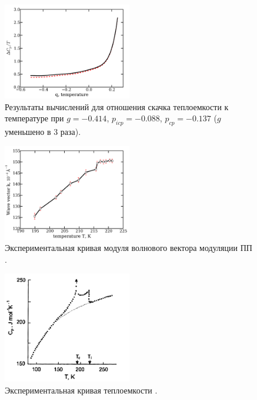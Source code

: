 \begin{figure}\label{fig:g_3-cpt}
\includegraphics[width = 0.5\textwidth]{figs/g_3-cpt.pdf}
\caption{Результаты вычислений для отношения скачка теплоемкости к температуре при $g= -0.414$, $p_{icp}= -0.088$, $p_{cp}=-0.137$ ($g$ уменьшено в 3 раза).}
\end{figure}

\begin{figure}\label{fig:exp-wn}
\includegraphics[width = 0.5\textwidth]{figs/exp-wn.pdf}
\caption{Экспериментальная кривая модуля волнового вектора модуляции ПП \cite{Khoma1998}.}
\end{figure}

\begin{figure}\label{fig:exp-cp}
\includegraphics[width = 0.5\textwidth]{figs/exp-cp.pdf}
\caption{Экспериментальная кривая теплоемкости \cite{Khoma1998}.}
\end{figure}